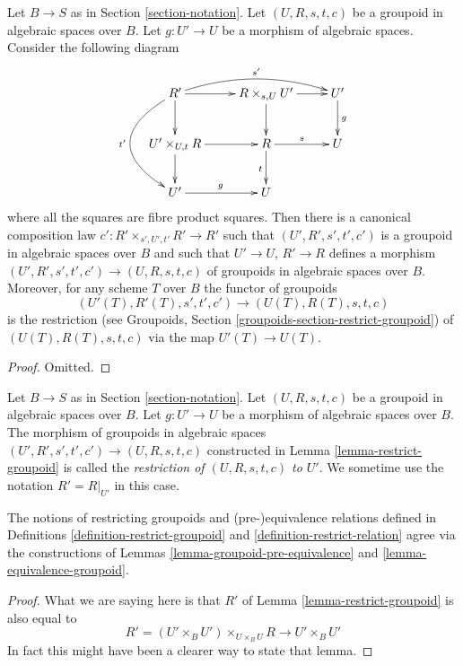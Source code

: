\begin{lemma}
\label{lemma-restrict-groupoid}
Let $B \to S$ as in Section \ref{section-notation}.
Let $(U, R, s, t, c)$ be a groupoid in algebraic spaces over $B$.
Let $g : U' \to U$ be a morphism of algebraic spaces.
Consider the following diagram
$$
\xymatrix{
R' \ar[d] \ar[r] \ar@/_3pc/[dd]_{t'} \ar@/^1pc/[rr]^{s'}&
R \times_{s, U} U' \ar[r] \ar[d] &
U' \ar[d]^g \\
U' \times_{U, t} R \ar[d] \ar[r] &
R \ar[r]^s \ar[d]_t &
U \\
U' \ar[r]^g &
U
}
$$
where all the squares are fibre product squares. Then there is a
canonical composition law $c' : R' \times_{s', U', t'} R' \to R'$
such that $(U', R', s', t', c')$ is a groupoid in algebraic spaces over
$B$ and such that $U' \to U$, $R' \to R$ defines a morphism
$(U', R', s', t', c') \to (U, R, s, t, c)$ of groupoids in algebraic spaces
over $B$. Moreover, for any scheme $T$ over $B$ the functor of groupoids
$$
(U'(T), R'(T), s', t', c') \to (U(T), R(T), s, t, c)
$$
is the restriction (see
Groupoids, Section \ref{groupoids-section-restrict-groupoid})
of $(U(T), R(T), s, t, c)$ via the map $U'(T) \to U(T)$.
\end{lemma}

\begin{proof}
Omitted.
\end{proof}

\begin{definition}
\label{definition-restrict-groupoid}
Let $B \to S$ as in Section \ref{section-notation}.
Let $(U, R, s, t, c)$ be a groupoid in algebraic spaces over $B$.
Let $g : U' \to U$ be a morphism of algebraic spaces over $B$.
The morphism of groupoids in algebraic spaces
$(U', R', s', t', c') \to (U, R, s, t, c)$
constructed in Lemma \ref{lemma-restrict-groupoid} is called
the {\it restriction of $(U, R, s, t, c)$ to $U'$}.
We sometime use the notation $R' = R|_{U'}$ in this case.
\end{definition}

\begin{lemma}
\label{lemma-restrict-groupoid-relation}
The notions of restricting groupoids and
(pre-)equivalence relations defined in Definitions
\ref{definition-restrict-groupoid} and \ref{definition-restrict-relation}
agree via the constructions of
Lemmas \ref{lemma-groupoid-pre-equivalence} and
\ref{lemma-equivalence-groupoid}.
\end{lemma}

\begin{proof}
What we are saying here is that $R'$ of
Lemma \ref{lemma-restrict-groupoid} is also
equal to
$$
R' = (U' \times_B U')\times_{U \times_B U} R
\longrightarrow
U' \times_B U'
$$
In fact this might have been a clearer way to state that lemma.
\end{proof}





